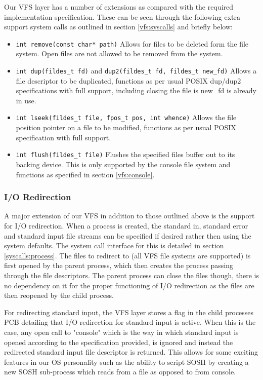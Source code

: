 \documentclass[12pt,english]{article}
\begin{document}
Our VFS layer has a number of extensions as compared with the required implementation specification. These can be seen through the following extra support system calls as outlined in section \ref{vfs:syscalls} and briefly below:

\begin{itemize}
\item \texttt{int remove(const char* path)} Allows for files to be deleted form the file system. Open files are not allowed to be removed from the system.
\item \texttt{int dup(fildes\_t fd)} and \texttt{dup2(fildes\_t fd, fildes\_t new\_fd)} Allows a file descriptor to be duplicated, functions as per usual POSIX dup/dup2 specifications with full support, including closing the file is new\_fd is already in use.
\item \texttt{int lseek(fildes\_t file, fpos\_t pos, int whence)} Allows the file position pointer on a file to be modified, functions as per usual POSIX specification with full support.
\item \texttt{int flush(fildes\_t file)} Flushes the specified files buffer out to its backing device. This is only supported by the console file system and functions as specified in section \ref{vfs:console}.
\end{itemize}

\subsubsection{I/O Redirection} \label{vfs:redirect}

A major extension of our VFS in addition to those outlined above is the support for I/O redirection. When a process is created, the standard in, standard error and standard input file streams can be specified if desired rather then using the system defaults. The system call interface for this is detailed in section \ref{syscalls:process}. The files to redirect to (all VFS file systems are supported) is first opened by the parent process, which then creates the process passing through the file descriptors. The parent process can close the files though, there is no dependency on it for the proper functioning of I/O redirection as the files are then reopened by the child process.

For redirecting standard input, the VFS layer stores a flag in the child processes PCB detailing that I/O redirection for standard input is active. When this is the case, any open call to "console" which is the way in which standard input is opened according to the specification provided, is ignored and instead the redirected standard input file descriptor is returned. This allows for some exciting features in our OS personality such as the ability to script SOSH by creating a new SOSH sub-process which reads from a file as opposed to from console.
\end{document}
